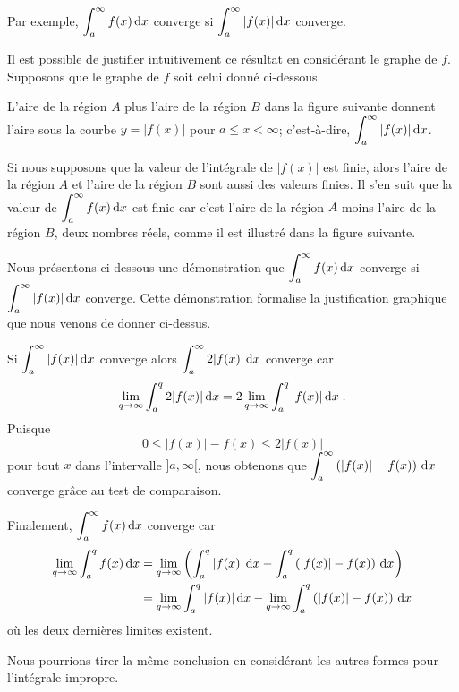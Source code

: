 {Par exemple, $\displaystyle \int_a^{\infty} f(x) \,\mathrm{d}x$
converge si $\displaystyle \int_a^{\infty} |f(x)| \,\mathrm{d}x$ converge.

Il est possible de justifier intuitivement ce résultat en considérant
le graphe de $f$.  Supposons que le graphe de $f$ soit celui donné
ci-dessous.

L'aire de la région $A$ plus l'aire de la région $B$ dans la figure
suivante donnent l'aire sous la courbe $y=|f(x)|$ pour $a\leq x < \infty$;
c'est-à-dire, $\displaystyle \int_a^{\infty} |f(x)| \,\mathrm{d}x$.

Si nous supposons que la valeur de l'intégrale de $|f(x)|$ est finie,
alors l'aire de la région $A$ et l'aire de la région $B$ sont
aussi des valeurs finies.  Il s'en suit que la valeur de
$\displaystyle \int_a^{\infty} f(x) \,\mathrm{d}x$ est finie
car c'est l'aire de la région $A$ moins l'aire de la région $B$, deux
nombres réels, comme il est illustré dans la figure suivante.

\begin{rmk}[\theory]
Nous présentons ci-dessous une démonstration que
$\displaystyle \int_a^{\infty} f(x) \,\mathrm{d}x$ 
converge si $\displaystyle \int_a^{\infty} |f(x)| \,\mathrm{d}x$ converge.
Cette démonstration formalise la justification graphique que nous
venons de donner ci-dessus.

Si $\displaystyle \int_a^\infty |f(x)| \,\mathrm{d}x$ converge alors
$\displaystyle \int_a^\infty 2|f(x)| \,\mathrm{d}x$ converge
car
\[
\lim_{q\rightarrow \infty} \int_a^q 2|f(x)| \,\mathrm{d}x =
2 \lim_{q\rightarrow \infty} \int_a^q |f(x)| \,\mathrm{d}x \; .
\]
Puisque
\[
0 \leq |f(x)| - f(x) \leq 2 |f(x)|
\]
pour tout $x$ dans l'intervalle $]a,\infty[$, nous obtenons que
$\displaystyle \int_a^\infty \left( |f(x)| - f(x) \right) \,\mathrm{d}x$
converge grâce au test de comparaison.

Finalement, $\displaystyle \int_a^\infty f(x) \,\mathrm{d}x$ converge car
\begin{align*}
\lim_{q\rightarrow \infty} \int_a^q f(x) \,\mathrm{d}x
&= \lim_{q\rightarrow \infty} \left( \int_a^q |f(x)| \,\mathrm{d}x
- \int_a^q \left( |f(x)| - f(x) \right) \,\mathrm{d}x \right) \\
&= \lim_{q\rightarrow \infty} \int_a^q |f(x)| \,\mathrm{d}x
- \lim_{q\rightarrow \infty} \int_a^q \left( |f(x)| - f(x) \right)
\,\mathrm{d}x
\end{align*}
où les deux dernières limites existent.

Nous pourrions tirer la même conclusion en considérant les autres
formes pour l'intégrale impropre.
\end{rmk}

}
